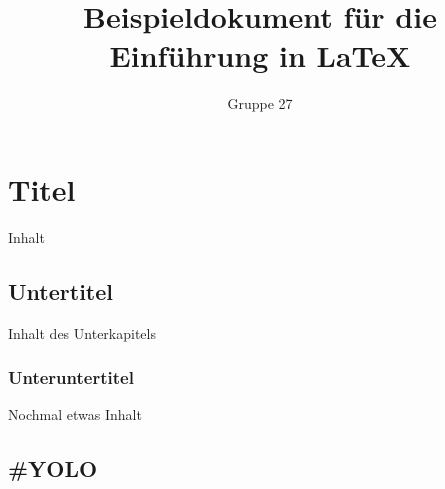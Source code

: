 \documentclass[a4paper,10pt,fleqn]{article}
\title{Beispieldokument für die Einführung in \LaTeX}
\author{Gruppe 27}
\begin{document}
\maketitle
\clearpage
\tableofcontents
\clearpage

\section{Titel}
Inhalt

\subsection{Untertitel}
Inhalt des Unterkapitels

\subsubsection{Unteruntertitel}
Nochmal etwas Inhalt

\subsection{ #YOLO }


\end{document}
